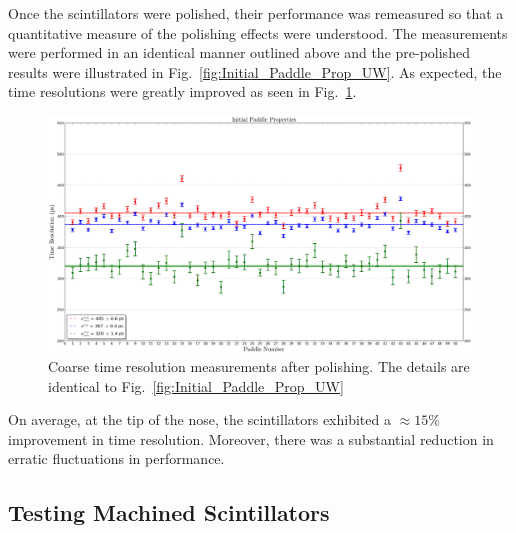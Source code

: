 Once the scintillators were polished, their performance was remeasured so that a quantitative measure of the polishing effects were understood.  The measurements were performed in an identical manner outlined above and the pre-polished results were illustrated in Fig.~\ref{fig:Initial_Paddle_Prop_UW}. As expected, the time resolutions were greatly improved as seen in Fig.~\ref{fig:Polished_Paddle_Prop_UW}.
\begin{figure}[!htb]
	\centering
	\includegraphics[width=1.0\columnwidth]{fabrication/figs/Polished_Paddle_Prop_UW}
	\caption[Coarse time resolution measurements after polishing]{Coarse time resolution measurements after polishing. The details are identical to Fig.~\ref{fig:Initial_Paddle_Prop_UW}}
	\label{fig:Polished_Paddle_Prop_UW}
\end{figure}
On average, at the tip of the nose, the scintillators exhibited a $\approx15\%$ improvement in time resolution.  Moreover, there was a substantial reduction in erratic fluctuations in performance.

\subsection{Testing Machined Scintillators} \label{sec:fab_test}


